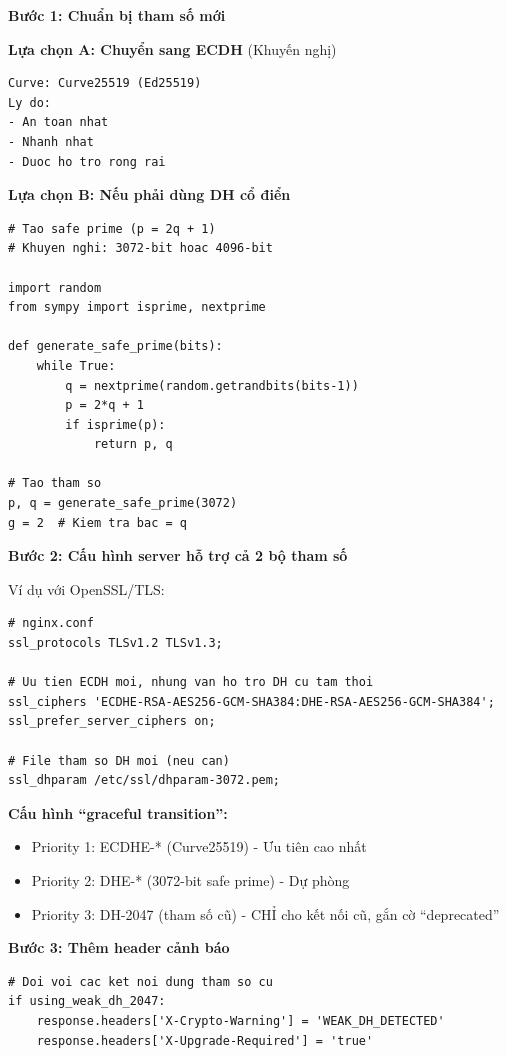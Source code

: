 \textbf{Bước 1: Chuẩn bị tham số mới}

\textbf{Lựa chọn A: Chuyển sang ECDH} (Khuyến nghị)

\begin{verbatim}
Curve: Curve25519 (Ed25519)
Ly do:
- An toan nhat
- Nhanh nhat
- Duoc ho tro rong rai
\end{verbatim}

\textbf{Lựa chọn B: Nếu phải dùng DH cổ điển}

\begin{verbatim}
# Tao safe prime (p = 2q + 1)
# Khuyen nghi: 3072-bit hoac 4096-bit

import random
from sympy import isprime, nextprime

def generate_safe_prime(bits):
    while True:
        q = nextprime(random.getrandbits(bits-1))
        p = 2*q + 1
        if isprime(p):
            return p, q

# Tao tham so
p, q = generate_safe_prime(3072)
g = 2  # Kiem tra bac = q
\end{verbatim}

\textbf{Bước 2: Cấu hình server hỗ trợ cả 2 bộ tham số}

Ví dụ với OpenSSL/TLS:

\begin{verbatim}
# nginx.conf
ssl_protocols TLSv1.2 TLSv1.3;

# Uu tien ECDH moi, nhung van ho tro DH cu tam thoi
ssl_ciphers 'ECDHE-RSA-AES256-GCM-SHA384:DHE-RSA-AES256-GCM-SHA384';
ssl_prefer_server_ciphers on;

# File tham so DH moi (neu can)
ssl_dhparam /etc/ssl/dhparam-3072.pem;
\end{verbatim}

\textbf{Cấu hình ``graceful transition'':}
\begin{itemize}
    \item Priority 1: ECDHE-* (Curve25519) - Ưu tiên cao nhất
    \item Priority 2: DHE-* (3072-bit safe prime) - Dự phòng
    \item Priority 3: DH-2047 (tham số cũ) - CHỈ cho kết nối cũ, gắn cờ ``deprecated''
\end{itemize}

\textbf{Bước 3: Thêm header cảnh báo}

\begin{verbatim}
# Doi voi cac ket noi dung tham so cu
if using_weak_dh_2047:
    response.headers['X-Crypto-Warning'] = 'WEAK_DH_DETECTED'
    response.headers['X-Upgrade-Required'] = 'true'
\end{verbatim}

